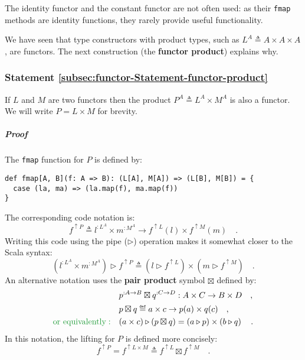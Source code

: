 The identity functor and the constant functor are not often used:
as their \lstinline!fmap! methods are identity functions, they rarely
provide useful functionality. 

We have seen that type constructors with product types, such as $L^{A}\triangleq A\times A\times A$,
are functors. The next construction (the \textbf{functor
product}) explains why.

\subsubsection{Statement \label{subsec:functor-Statement-functor-product}\ref{subsec:functor-Statement-functor-product}}

If $L$ and $M$ are two functors then the product
$P^{A}\triangleq L^{A}\times M^{A}$ is also a functor. We will write
$P=L\times M$ for brevity.

\subparagraph{Proof}

The \lstinline!fmap! function for $P$ is defined by:
\begin{lstlisting}
def fmap[A, B](f: A => B): (L[A], M[A]) => (L[B], M[B]) = {
  case (la, ma) => (la.map(f), ma.map(f))
}
\end{lstlisting}
The corresponding code notation is:
\[
f^{\uparrow P}\triangleq l^{:L^{A}}\times m^{:M^{A}}\rightarrow f^{\uparrow L}(l)\times f^{\uparrow M}(m)\quad.
\]
Writing this code using the pipe ($\triangleright$) operation makes
it somewhat closer to the Scala syntax:
\begin{equation}
(l^{:L^{A}}\times m^{:M^{A}})\triangleright f^{\uparrow P}\triangleq(l\triangleright f^{\uparrow L})\times(m\triangleright f^{\uparrow M})\quad.\label{eq:f-def-of-functor-product-lift}
\end{equation}
An alternative notation uses the \textbf{pair
product} symbol $\boxtimes$ defined by:
\begin{align*}
 & p^{:A\rightarrow B}\boxtimes q^{:C\rightarrow D}:A\times C\rightarrow B\times D\quad,\\
 & p\boxtimes q\triangleq a\times c\rightarrow p(a)\times q(c)\quad,\\
{\color{greenunder}\text{or equivalently}:}\quad & (a\times c)\triangleright\left(p\boxtimes q\right)=\left(a\triangleright p\right)\times\left(b\triangleright q\right)\quad.
\end{align*}
In this notation, the lifting for $P$ is defined more concisely:
\begin{equation}
f^{\uparrow P}=f^{\uparrow L\times M}\triangleq f^{\uparrow L}\boxtimes f^{\uparrow M}\quad.\label{eq:def-of-functor-product-fmap}
\end{equation}

